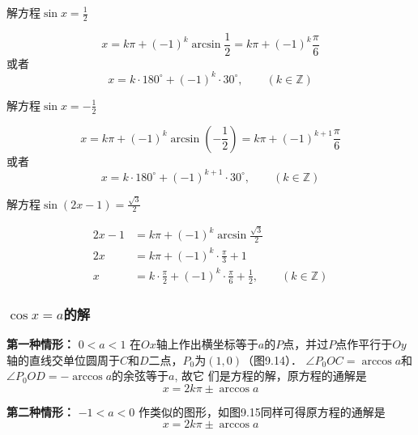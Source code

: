 \begin{example}
    解方程$\sin x=\frac{1}{2} $
\end{example}

\begin{solution}
    \[x=k\pi+(-1)^k\arcsin\frac{1}{2}=k\pi+(-1)^k\frac{\pi}{6}\]
    或者\[x=k\cdot 180^{\circ}+(-1)^k\cdot 30^{\circ},\qquad (k\in\mathbb{Z})\]
\end{solution}


\begin{example}
    解方程$\sin x=-\frac{1}{2} $
\end{example}

\begin{solution}
\[x=k\pi+(-1)^k\arcsin\left(-\frac{1}{2}\right)=k\pi+(-1)^{k+1}\frac{\pi}{6}\]
    或者\[x=k\cdot 180^{\circ}+(-1)^{k+1}\cdot  30^{\circ},\qquad (k\in\mathbb{Z})\]
\end{solution}


\begin{example}
    解方程$\sin (2x-1)=\frac{\sqrt{3}}{2} $
\end{example}

\begin{solution}
\[\begin{split}
   2x-1&=k\pi+(-1)^k \arcsin\frac{\sqrt{3}}{2}\\ 
2x&=k\pi+(-1)^k \cdot \frac{\pi}{3}+1\\
  x &=k\cdot\frac{\pi}{2}+(-1)^k\cdot \frac{\pi}{6}+\frac{1}{2} ,\qquad (k\in\mathbb{Z})
 \end{split}\]   
\end{solution}

\subsubsection{$\cos x=a$的解}

\textbf{第一种情形：} $0<a<1$
在$Ox$轴上作出横坐标等于$a$的$P$点，并过$P$点作平行于$Oy$
轴的直线交单位圆周于$C$和$D$二点，$P_0$为$(1,0)$（图9.14）．
$\angle P_0OC=\arccos a$和$\angle P_0OD=-\arccos a$的余弦等于$a$, 故它
们是方程的解，原方程的通解是
\[x=2k\pi\pm \arccos a\]

\textbf{第二种情形：} $-1<a<0$
作类似的图形，如图9.15同样可得原方程的通解是
\[x=2k\pi\pm \arccos a\]


